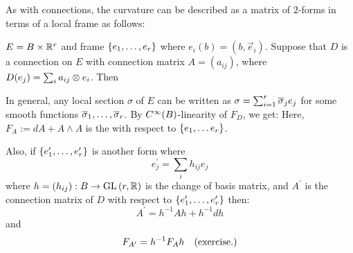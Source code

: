 \documentclass[main.tex]{subfiles}
\begin{document}
As with connections, the curvature can be described as a matrix of $2$-forms in terms of a local frame as follows:

\begin{exmp}
    $E = B \times \mathbb{R}^r$ and frame $\left\{e_1,\dots, e_r\right\}$ where $e_i(b) = (b, \vec{e}_i)$. Suppose that $D$ is a connection on $E$ with connection matrix $A = (a_{ij})$, where $D(e_j) = \sum_i a_{ij} \otimes e_i$. Then

    In general, any local section $\sigma$ of $E$ can be written as $\sigma = \sum_{i=1}^r \overline{\sigma}_j e_j$ for some smooth functions $\overline{\sigma}_1, \dots, \overline{\sigma}_r$. By $C^\infty(B)$-linearity of $F_D$, we get:
    Here, $F_A := dA + A \wedge A$ is the  with respect to $\left\{e_1, \dots e_r\right\}$.

    Also, if $\left\{e_1^\prime, \dots, e_r^\prime\right\}$ is another form where
    \[
    e_j^\prime = \sum_i h_{ij} e_j
    \]
    where $h = (h_{ij}) : B \to \text{GL}\left( r, \mathbb{R} \right)$ is the change of basis matrix, and $A^\prime$ is the connection matrix of $D$ with respect to $\left\{e_1^\prime, \dots, e_r^\prime\right\}$ then:
    \[
      A^\prime = h^{-1}Ah + h^{-1}dh
    \]
    and
    \[
    F_{A^\prime} = h^{-1} F_A h \hspace{1em}\text{(exercise.)}
    \]

\end{exmp}
\end{document}
